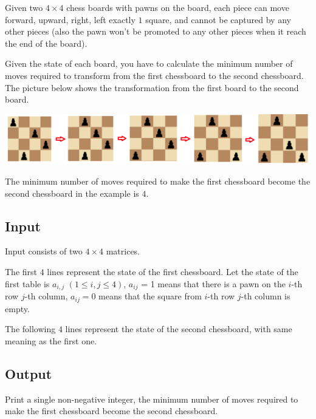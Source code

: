 \documentclass[12pt]{article}
\begin{document}
	Given two $4 \times 4$ chess boards with pawns on the board, each piece can move forward, upward, right, left exactly $1$ square, and cannot be captured by any other pieces (also the pawn won't be promoted to any other pieces when it reach the end of the board).
	
	Given the state of each board, you have to calculate the minimum number of moves required to transform from the first chessboard to the second chessboard. The picture below shows the transformation from the first board to the second board.
	
	\begin{center}
		\includegraphics[width = 150mm]{example.png}
		
		The minimum number of moves required to make the first chessboard become the second chessboard in the example is $4$.
	\end{center}
	
	\subsection*{Input}
	
	Input consists of two $4 \times 4$ matrices.
	
	The first $4$ lines represent the state of the first chessboard. Let the state of the first table is $a_{i,j}$ $(1 \le i,j \le 4)$, $a_{ij}$ = 1 means that there is a pawn on the $i$-th row $j$-th column, $a_{ij} = 0$ means that the square from $i$-th row $j$-th column is empty.
	
	The following $4$ lines represent the state of the second chessboard, with same meaning as the first one.

	\subsection*{Output}
	
	Print a single non-negative integer, the minimum number of moves required to make the first chessboard become the second chessboard.
	
\end{document}
